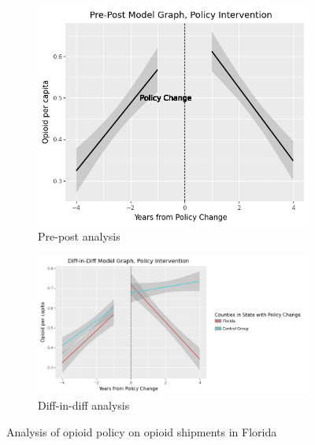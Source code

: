 \documentclass[12pt,letterpaper]{article}
\begin{document}
\begin{figure}[!h]
\centering
\begin{subfigure}{.5\textwidth}
  \centering
  \includegraphics[width=.7\linewidth]{../30_results/General_Results/florida_opioid_shipment_prepost.png}
  \caption{Pre-post analysis}
  \label{fig:fl_ship_prepost}
\end{subfigure}%
\begin{subfigure}{.55\textwidth}
  \centering
  \includegraphics[width=1\linewidth]{../30_results/General_Results/florida_opioid_shipment_diffdiff.png}
  \caption{Diff-in-diff analysis}
  \label{fig:fl_ship_did}
\end{subfigure}
\caption{Analysis of opioid policy on opioid shipments in Florida}
\label{fig:fl_ship}
\end{figure}
\end{document}
